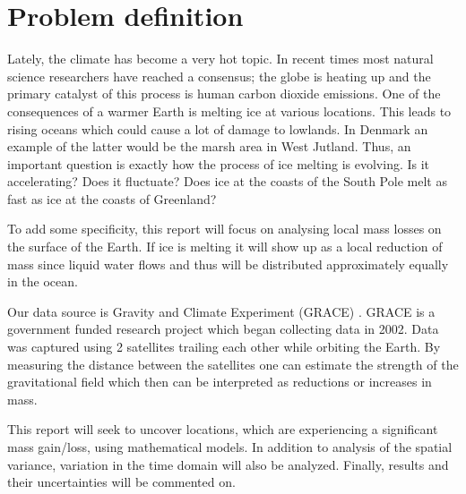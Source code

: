\section{Problem definition}
Lately, the climate has become a very hot topic. 
In recent times most natural science researchers have reached a consensus;
the globe is heating up and the primary catalyst of this process is human carbon dioxide emissions.
One of the consequences of a warmer Earth is melting ice at various locations.
This leads to rising oceans which could cause a lot of damage to lowlands.
In Denmark an example of the latter would be the marsh area in West Jutland.
Thus, an important question is exactly how the process of ice melting is evolving. 
Is it accelerating? Does it fluctuate? Does ice at the coasts of the South Pole melt as fast as ice at the coasts of Greenland?

To add some specificity, this report will focus on analysing local mass losses on the surface of the Earth.
If ice is melting it will show up as a local reduction of mass since liquid water flows and thus will be distributed approximately equally in the ocean. 

Our data source is Gravity and Climate Experiment (GRACE) \cite{GRACE-data-source}. 
GRACE is a government funded research project which began collecting data in 2002.
Data was captured using 2 satellites trailing each other while orbiting the Earth.
By measuring the distance between the satellites one can estimate the strength of the gravitational field which then can be interpreted as reductions or increases in mass.

This report will seek to uncover locations, which are experiencing a significant mass gain/loss, using mathematical models. 
In addition to analysis of the spatial variance, variation in the time domain will also be analyzed.
Finally, results and their uncertainties will be commented on.
